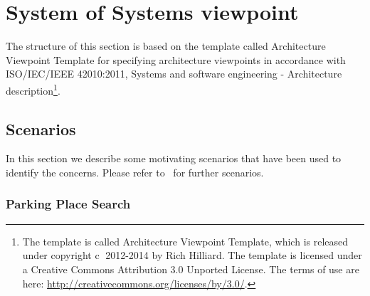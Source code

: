 \section{System of Systems viewpoint}\label{sec:SoS}

The structure of this section is based on the template called Architecture Viewpoint Template for specifying architecture viewpoints in accordance with ISO/IEC/IEEE 42010:2011, Systems and software engineering - Architecture description\footnote{The template is called Architecture Viewpoint Template, which is released under copyright 
\textcircled{c} 2012-2014
by Rich Hilliard. The template is licensed under a Creative Commons Attribution 3.0 Unported License.
The terms of use are here: \url{http://creativecommons.org/licenses/by/3.0/}.}.

\subsection{Scenarios}\label{sec:scenarios}


In this section we describe some motivating scenarios that have been used to identify the concerns. Please refer to~\cite{JSA2017} for further scenarios.


\subsubsection{Parking Place Search}

